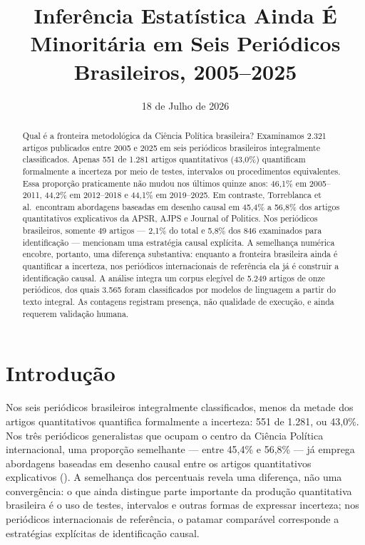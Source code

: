 \documentclass[
]{article}
\title{Inferência Estatística Ainda É Minoritária em Seis Periódicos
Brasileiros, 2005--2025}
\author{}
\date{\vspace{-2.5em}18 de Julho de 2026}
\begin{document}
\maketitle
\begin{abstract}
Qual é a fronteira metodológica da Ciência Política brasileira?
Examinamos 2.321 artigos publicados entre 2005 e 2025 em seis periódicos
brasileiros integralmente classificados. Apenas 551 de 1.281 artigos
quantitativos (43,0\%) quantificam formalmente a incerteza por meio de
testes, intervalos ou procedimentos equivalentes. Essa proporção
praticamente não mudou nos últimos quinze anos: 46,1\% em 2005--2011,
44,2\% em 2012--2018 e 44,1\% em 2019--2025. Em contraste, Torreblanca
et al.~encontram abordagens baseadas em desenho causal em 45,4\% a
56,8\% dos artigos quantitativos explicativos da APSR, AJPS e Journal of
Politics. Nos periódicos brasileiros, somente 49 artigos --- 2,1\% do
total e 5,8\% dos 846 examinados para identificação --- mencionam uma
estratégia causal explícita. A semelhança numérica encobre, portanto,
uma diferença substantiva: enquanto a fronteira brasileira ainda é
quantificar a incerteza, nos periódicos internacionais de referência ela
já é construir a identificação causal. A análise integra um corpus
elegível de 5.249 artigos de onze periódicos, dos quais 3.565 foram
classificados por modelos de linguagem a partir do texto integral. As
contagens registram presença, não qualidade de execução, e ainda
requerem validação humana.
\end{abstract}

\section{Introdução}\label{introduuxe7uxe3o}

Nos seis periódicos brasileiros integralmente classificados, menos da
metade dos artigos quantitativos quantifica formalmente a incerteza: 551
de 1.281, ou 43,0\%. Nos três periódicos generalistas que ocupam o
centro da Ciência Política internacional, uma proporção semelhante ---
entre 45,4\% e 56,8\% --- já emprega abordagens baseadas em desenho
causal entre os artigos quantitativos explicativos
(). A semelhança
dos percentuais revela uma diferença, não uma convergência: o que ainda
distingue parte importante da produção quantitativa brasileira é o uso
de testes, intervalos e outras formas de expressar incerteza; nos
periódicos internacionais de referência, o patamar comparável
corresponde a estratégias explícitas de identificação causal.
\end{document}
